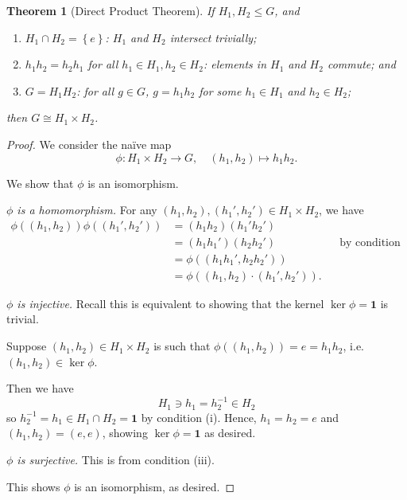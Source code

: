 \documentclass{article}
\newtheorem{theorem}{Theorem}[section]
\theoremstyle{definition}
\theoremstyle{remark}
\newcommand{\pqty}[1]{\left(#1\right)}
\newcommand{\Bqty}[1]{\left\{#1\right\}}
\newcommand{\function}[5]{#1:#2\to #3,\quad #4\mapsto #5}
\newcommand{\inverse}{^{-1}}
\newcommand{\isomorphic}{\cong}
\newcommand{\subgroup}{\leq}
\newcommand{\trivialgp}{\mathbf{1}}
\begin{document}
\begin{theorem}[Direct Product Theorem]
    \label{thm:dpt-direct-product-theorem}%
    If \(H_1, H_2 \subgroup G\), and
    \begin{enumerate}
        \item \(H_1 \cap H_2 = \Bqty{e}\): \(H_1\) and \(H_2\) \emph{intersect trivially};
        \item \(h_1 h_2 = h_2 h_1\) for all \(h_1 \in H_1, h_2 \in H_2\): elements in \(H_1\) and \(H_2\) \emph{commute}; and
        \item \(G = H_1 H_2\): for all \(g \in G\), \(g = h_1 h_2\) for some \(h_1 \in H_1\) and \(h_2 \in H_2\);
    \end{enumerate}
    then \(G \isomorphic H_1 \times H_2\).
\end{theorem}

\begin{proof}
    We consider the na\"{i}ve map
    \[
        \function{\phi}{H_1 \times H_2}{G}{\pqty{h_1, h_2}}{h_1 h_2.}
    \]

    We show that \(\phi\) is an isomorphism.

    \emph{\(\phi\) is a homomorphism.} For any \(\pqty{h_1, h_2}, \pqty{h_1', h_2'} \in H_1 \times H_2\), we have
    \begin{align*}
        \phi\pqty{\pqty{h_1, h_2}} \phi\pqty{\pqty{h_1', h_2'}} &= \pqty{h_1 h_2} \pqty{h_1' h_2'} \\
        &= \pqty{h_1 h_1'} \pqty{h_2 h_2'} && \text{by condition (iii)} \\
        &= \phi\pqty{\pqty{h_1 h_1', h_2 h_2'}} \\
        &= \phi\pqty{\pqty{h_1, h_2} \cdot \pqty{h_1', h_2'}}.
    \end{align*}

    \emph{\(\phi\) is injective.} Recall this is equivalent to showing that the kernel \(\ker \phi = \trivialgp\) is trivial.

    Suppose \(\pqty{h_1, h_2} \in H_1 \times H_2\) is such that \(\phi\pqty{\pqty{h_1, h_2}} = e = h_1 h_2\), i.e. \(\pqty{h_1, h_2} \in \ker\phi\).

    Then we have
    \[
        H_1 \ni h_1 = h_2\inverse \in H_2
    \]
    so \(h_2\inverse = h_1 \in H_1 \cap H_2 = \trivialgp\) by condition (i). Hence, \(h_1 = h_2 = e\) and \(\pqty{h_1, h_2} = \pqty{e, e}\), showing \(\ker \phi = \trivialgp\) as desired.

    \emph{\(\phi\) is surjective.} This is from condition (iii).

    This shows \(\phi\) is an isomorphism, as desired.
\end{proof}
\end{document}
